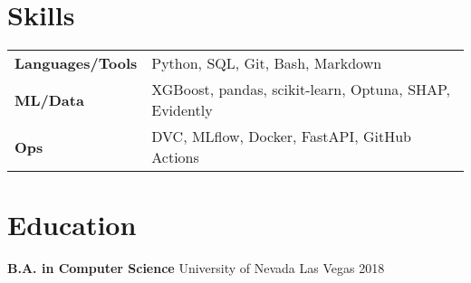 \documentclass[a4paper,10pt]{article}
\begin{document}
\section*{Skills}
\begin{tabular}{p{} p{}}
\textbf{Languages/Tools} & Python, SQL, Git, Bash, Markdown \\
\textbf{ML/Data} & XGBoost, pandas, scikit-learn, Optuna, SHAP, Evidently \\
\textbf{Ops} & DVC, MLflow, Docker, FastAPI, GitHub Actions \\
\end{tabular}


\section*{Education}

\textbf{B.A. in Computer Science} \hfill University of Nevada Las Vegas \hfill 2018
\end{document}
